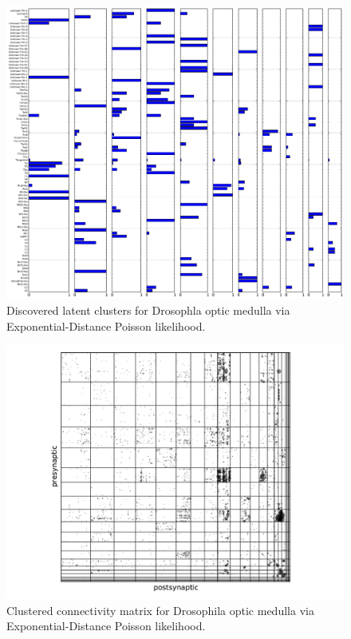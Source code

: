 \documentclass{article}
\begin{document}
\begin{figure}
  \centering
  \includegraphics[width=\textwidth]{drosophila/drosophila.edp.data-fixed_100_200-anneal_slow_400.0.clusters.pdf}
  \caption{Discovered latent clusters for Drosophla optic medulla via Exponential-Distance Poisson likelihood.}
  \label{fig:drosophila:clusters_edp}
\end{figure}

\begin{figure}
  \centering
  \includegraphics[width=\textwidth]{drosophila/drosophila.edp.data-fixed_100_200-anneal_slow_400.0.latent.pdf}
  \caption{Clustered connectivity matrix for Drosophila optic medulla via Exponential-Distance Poisson likelihood.}
  \label{fig:drosophila:latent_edp}
\end{figure}
\end{document}
